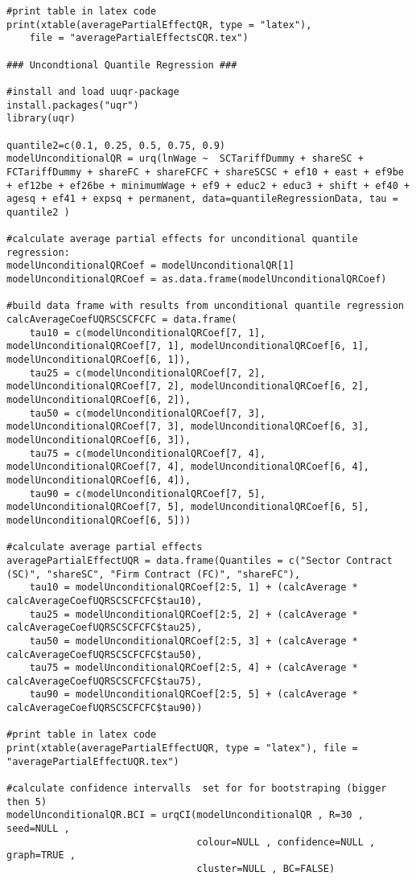 \begin{lstlisting}
#print table in latex code
print(xtable(averagePartialEffectQR, type = "latex"), 
	file = "averagePartialEffectsCQR.tex")

### Uncondtional Quantile Regression ###

#install and load uuqr-package
install.packages("uqr")
library(uqr)

quantile2=c(0.1, 0.25, 0.5, 0.75, 0.9)
modelUnconditionalQR = urq(lnWage ~  SCTariffDummy + shareSC + FCTariffDummy + shareFC + shareFCFC + shareSCSC + ef10 + east + ef9be + ef12be + ef26be + minimumWage + ef9 + educ2 + educ3 + shift + ef40 + agesq + ef41 + expsq + permanent, data=quantileRegressionData, tau = quantile2 )

#calculate average partial effects for unconditional quantile regression:
modelUnconditionalQRCoef = modelUnconditionalQR[1]
modelUnconditionalQRCoef = as.data.frame(modelUnconditionalQRCoef)

#build data frame with results from unconditional quantile regression
calcAverageCoefUQRSCSCFCFC = data.frame(
	tau10 = c(modelUnconditionalQRCoef[7, 1], modelUnconditionalQRCoef[7, 1], modelUnconditionalQRCoef[6, 1], modelUnconditionalQRCoef[6, 1]),
	tau25 = c(modelUnconditionalQRCoef[7, 2], modelUnconditionalQRCoef[7, 2], modelUnconditionalQRCoef[6, 2], modelUnconditionalQRCoef[6, 2]), 
	tau50 = c(modelUnconditionalQRCoef[7, 3], modelUnconditionalQRCoef[7, 3], modelUnconditionalQRCoef[6, 3], modelUnconditionalQRCoef[6, 3]), 
	tau75 = c(modelUnconditionalQRCoef[7, 4], modelUnconditionalQRCoef[7, 4], modelUnconditionalQRCoef[6, 4], modelUnconditionalQRCoef[6, 4]), 
	tau90 = c(modelUnconditionalQRCoef[7, 5], modelUnconditionalQRCoef[7, 5], modelUnconditionalQRCoef[6, 5], modelUnconditionalQRCoef[6, 5]))

#calculate average partial effects
averagePartialEffectUQR = data.frame(Quantiles = c("Sector Contract (SC)", "shareSC", "Firm Contract (FC)", "shareFC"), 
	tau10 = modelUnconditionalQRCoef[2:5, 1] + (calcAverage * calcAverageCoefUQRSCSCFCFC$tau10), 
	tau25 = modelUnconditionalQRCoef[2:5, 2] + (calcAverage * calcAverageCoefUQRSCSCFCFC$tau25),
	tau50 = modelUnconditionalQRCoef[2:5, 3] + (calcAverage * calcAverageCoefUQRSCSCFCFC$tau50),
	tau75 = modelUnconditionalQRCoef[2:5, 4] + (calcAverage * calcAverageCoefUQRSCSCFCFC$tau75), 
	tau90 = modelUnconditionalQRCoef[2:5, 5] + (calcAverage * calcAverageCoefUQRSCSCFCFC$tau90))                                                 

#print table in latex code
print(xtable(averagePartialEffectUQR, type = "latex"), file = "averagePartialEffectUQR.tex") 

#calculate confidence intervalls  set for for bootstraping (bigger then 5)
modelUnconditionalQR.BCI = urqCI(modelUnconditionalQR , R=30 , seed=NULL , 
                                 colour=NULL , confidence=NULL , graph=TRUE , 
                                 cluster=NULL , BC=FALSE)


\end{lstlisting}